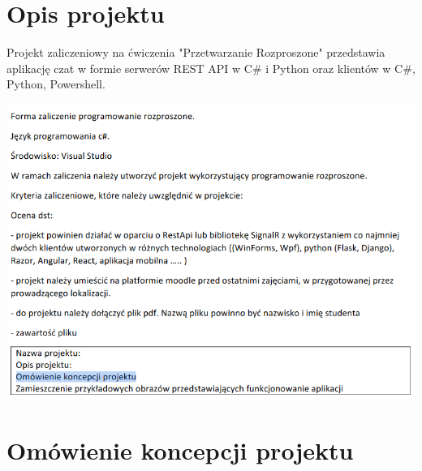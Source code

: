
\setlength{\parindent}{1.25cm} %

\section{Opis projektu}

\begin{spacing}{1.5} %
    Projekt zaliczeniowy na ćwiczenia "Przetwarzanie Rozproszone" przedstawia aplikację czat w formie serwerów REST API w C\# i Python oraz klientów w C\#, Python, Powershell.
\end{spacing} %
\noindent\hspace*{-0.3cm} %
\includegraphics[width=1.0\textwidth]{assets/tekst_zadania.png}


\section{Omówienie koncepcji projektu}

